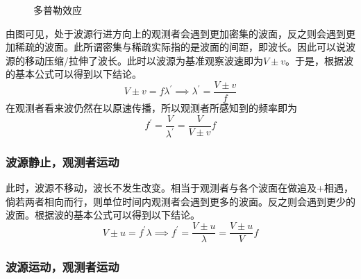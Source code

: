 \begin{figure}[ht!]
    \centering
    \caption{多普勒效应}
\end{figure}
由图可见，处于波源行进方向上的观测者会遇到更加密集的波面，反之则会遇到更加稀疏的波面。此所谓密集与稀疏实际指的是波面的间距，即波长。因此可以说波源的移动压缩/拉伸了波长。此时以波源为基准观察波速即为$V\pm v$。于是，根据波的基本公式可以得到以下结论。
\begin{equation*}
    V\pm v=f\lambda^\prime\implies
    \lambda^\prime=\frac{V\pm v}{f}
\end{equation*}
在观测者看来波仍然在以原速传播，所以观测者所感知到的频率即为
\begin{equation*}
    f^\prime=\frac{V}{\lambda^\prime}=\frac{V}{V\pm v}f
\end{equation*}

\subsubsection{波源静止，观测者运动}

此时，波源不移动，波长不发生改变。相当于观测者与各个波面在做追及+相遇，倘若两者相向而行，则单位时间内观测者会遇到更多的波面。反之则会遇到更少的波面。根据波的基本公式可以得到以下结论。
\begin{equation*}
    V\pm u=f^\prime\lambda\implies
    f^\prime=\frac{V\pm u}{\lambda}
    =\frac{V\pm u}{V}f
\end{equation*}

\subsubsection{波源运动，观测者运动}

